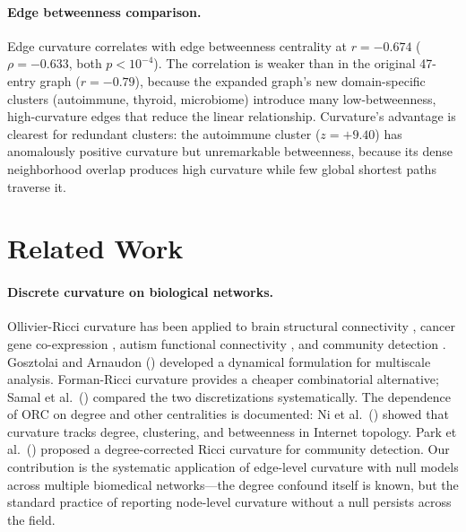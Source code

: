 \documentclass[11pt]{article}
\begin{document}
\paragraph{Edge betweenness comparison.} Edge curvature correlates with edge betweenness centrality at $r = -0.674$ ($\rho = -0.633$, both $p < 10^{-4}$). The correlation is weaker than in the original 47-entry graph ($r = -0.79$), because the expanded graph's new domain-specific clusters (autoimmune, thyroid, microbiome) introduce many low-betweenness, high-curvature edges that reduce the linear relationship. Curvature's advantage is clearest for redundant clusters: the autoimmune cluster ($z = +9.40$) has anomalously positive curvature but unremarkable betweenness, because its dense neighborhood overlap produces high curvature while few global shortest paths traverse it.

\section{Related Work}

\paragraph{Discrete curvature on biological networks.} Ollivier-Ricci curvature has been applied to brain structural connectivity \citep{farooq2019network}, cancer gene co-expression \citep{sandhu2015graph}, autism functional connectivity \citep{simhal2020measuring, elumalai2022graph}, and community detection \citep{ni2019community, sia2019ollivier}. Gosztolai and Arnaudon (\citeyear{gosztolai2021unfolding}) developed a dynamical formulation for multiscale analysis. Forman-Ricci curvature \citep{sreejith2016forman} provides a cheaper combinatorial alternative; Samal et al.\ (\citeyear{samal2018comparative}) compared the two discretizations systematically. The dependence of ORC on degree and other centralities is documented: Ni et al.\ (\citeyear{ni2015ricci}) showed that curvature tracks degree, clustering, and betweenness in Internet topology. Park et al.\ (\citeyear{park2025degreecorrected}) proposed a degree-corrected Ricci curvature for community detection. Our contribution is the systematic application of edge-level curvature with null models across multiple biomedical networks---the degree confound itself is known, but the standard practice of reporting node-level curvature without a null persists across the field.
\end{document}
